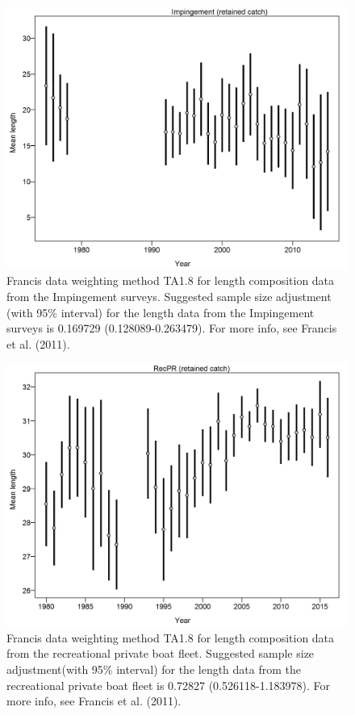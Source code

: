 \documentclass[12pt,]{article}
\begin{document}
\begin{figure}[htbp]
\centering
\includegraphics{r4ss/plots_mod1/comp_lendat_data_weighting_TA1.8_Impingement.png}
\caption{Francis data weighting method TA1.8 for length composition data
from the Impingement surveys. Suggested sample size adjustment (with
95\% interval) for the length data from the Impingement surveys is
0.169729 (0.128089-0.263479). For more info, see Francis et al. (2011).
\label{fig:comp_lendat_data_weighting_TA1.8_Impingement}}
\end{figure}

\begin{figure}[htbp]
\centering
\includegraphics{r4ss/plots_mod1/comp_lendat_data_weighting_TA1.8_RecPR.png}
\caption{Francis data weighting method TA1.8 for length composition data
from the recreational private boat fleet. Suggested sample size
adjustment(with 95\% interval) for the length data from the recreational
private boat fleet is 0.72827 (0.526118-1.183978). For more info, see
Francis et al. (2011).
\label{fig:comp_lendat_data_weighting_TA1.8_RecPR}}
\end{figure}
\end{document}
